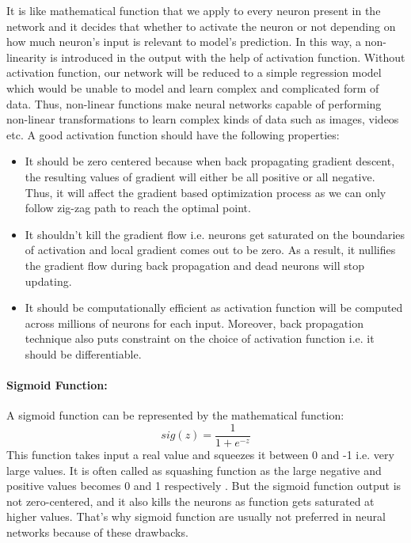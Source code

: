 It is like mathematical function that we apply to every neuron present in the network and it decides that whether to activate the neuron 
or not depending on how much neuron’s input is relevant to model’s prediction. 
In this way, a non-linearity is introduced in the output with the help of activation function. Without activation function, our network will be reduced to a simple 
regression model which would be unable to model and learn complex and complicated 
form of data. Thus, non-linear functions make neural networks capable 
of performing non-linear transformations to learn complex kinds of data such 
as 	images, videos etc. A good activation 
function should have the following properties:
\begin{itemize}
\item It should be zero centered because when back propagating gradient descent, the resulting values of gradient will either be all positive or all negative. Thus, it will affect the gradient based optimization process as we can only follow zig-zag path to reach the optimal point.
\item It shouldn’t kill the gradient flow i.e. neurons get saturated on the boundaries of activation and local gradient comes out to be zero. As a result, it nullifies the gradient flow during back propagation and dead neurons will stop updating.
\item It should be computationally efficient as activation function will be computed across millions of neurons for each input. Moreover, back propagation technique also puts constraint on the choice of activation function i.e. it should be differentiable.

\end{itemize}

\paragraph*{Sigmoid Function:}
A sigmoid function can be represented by the mathematical function:
\begin{equation}
	sig(z) = \frac{1}{1+e^{-z}}
\end{equation}
This function takes input a real value and squeezes 
it between 0 and -1 i.e. very large values. It is often called
as squashing function as the large negative and positive 
values becomes 0 and 1 respectively \cite{chap_3_article:5} . But the sigmoid function 
output is not zero-centered, and it also kills the neurons as function 
gets saturated at higher values. That’s why sigmoid function are usually 
not preferred in neural networks because of these drawbacks.

